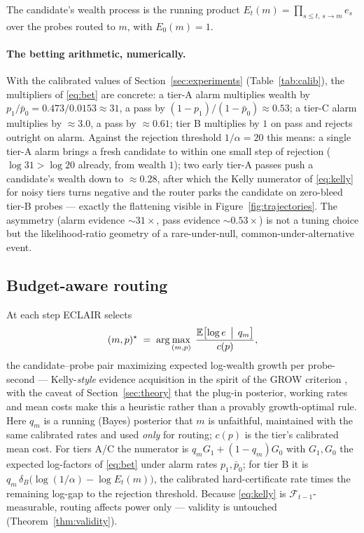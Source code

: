 \documentclass[pdflatex,sn-mathphys-num]{sn-jnl}
\theoremstyle{thmstyleone}
\theoremstyle{thmstyletwo}
\newcommand{\Eproc}{E}
\newcommand{\Filt}{\mathcal{F}}
\begin{document}
The candidate's wealth process is the running product
$\Eproc_t(m) = \prod_{s \le t,\, s \to m} e_s$ over the probes routed
to $m$, with $\Eproc_0(m) = 1$.

\paragraph{The betting arithmetic, numerically.}
With the calibrated values of Section~\ref{sec:experiments}
(Table~\ref{tab:calib}), the multipliers of \eqref{eq:bet} are
concrete: a tier-A alarm multiplies wealth by
$p_1/\bar p_0 = 0.473/0.0153 \approx 31$, a pass by
$(1{-}p_1)/(1{-}\bar p_0) \approx 0.53$; a tier-C alarm multiplies by
${\approx}3.0$, a pass by ${\approx}0.61$; tier B multiplies by $1$
on pass and rejects outright on alarm. Against the rejection
threshold $1/\alpha = 20$ this means: a single tier-A alarm brings a
fresh candidate to within one small step of rejection
($\log 31 > \log 20$ already, from wealth $1$); two early tier-A
passes push a candidate's wealth down to ${\approx}0.28$, after which
the Kelly numerator of \eqref{eq:kelly} for noisy tiers turns
negative and the router parks the candidate on zero-bleed tier-B
probes --- exactly the flattening visible in
Figure~\ref{fig:trajectories}. The asymmetry (alarm evidence
${\sim}31\times$, pass evidence ${\sim}0.53\times$) is not a tuning
choice but the likelihood-ratio geometry of a rare-under-null,
common-under-alternative event.

\subsection{Budget-aware routing}\label{sec:routing}

At each step ECLAIR selects
\begin{equation}\label{eq:kelly}
(m, p)^\star \;=\; \arg\max_{(m,p)}\;
\frac{\mathbb{E}\bigl[\log e \,\bigm|\, q_m\bigr]}{c(p)},
\end{equation}
the candidate--probe pair maximizing expected log-wealth growth per
probe-second --- Kelly-\emph{style} evidence acquisition in the
spirit of the GROW criterion \cite{grunwald2024safe, kelly1956new},
with the caveat of Section~\ref{sec:theory} that the plug-in
posterior, working rates and mean costs make this a heuristic rather
than a provably growth-optimal rule. Here $q_m$ is a
running (Bayes) posterior that $m$ is unfaithful, maintained with the
same calibrated rates and used \emph{only} for routing; $c(p)$ is the
tier's calibrated mean cost. For tiers A/C the numerator is
$q_m G_1 + (1-q_m) G_0$ with $G_1, G_0$ the expected log-factors of
\eqref{eq:bet} under alarm rates $p_1, \bar p_0$; for tier B it is
$q_m\,\delta_B \bigl(\log(1/\alpha) - \log \Eproc_t(m)\bigr)$, the
calibrated hard-certificate rate times the remaining log-gap to the
rejection threshold. Because \eqref{eq:kelly} is
$\Filt_{t-1}$-measurable, routing affects power only --- validity is
untouched (Theorem~\ref{thm:validity}).
\end{document}
